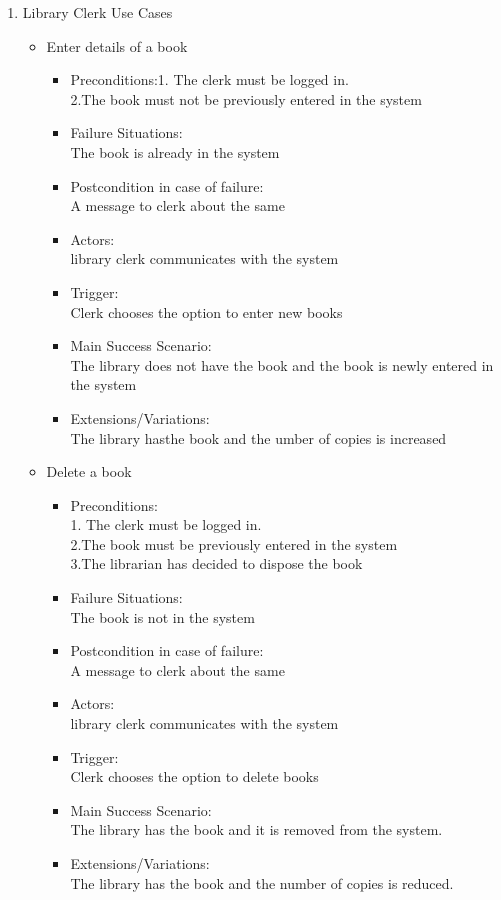 \documentclass{article}
\begin{document}
\begin{enumerate}
\item Library Clerk Use Cases
 \begin{itemize}
 \item Enter details of a book
 \begin{itemize}
 \item Preconditions:1. The clerk must be logged in.\\2.The book must not be previously entered in the system
 \item Failure Situations:\\ The book is already in the system
 \item Postcondition in case of failure:\\A message to clerk about the same
 \item Actors:\\ library clerk communicates with the system
 \item Trigger:\\ Clerk chooses the option to enter new books
 \item Main Success Scenario:\\ The library  does not have the book and the book is newly entered in the system
\item  Extensions/Variations:\\ The library hasthe book and the umber of copies is increased
\end{itemize}
 \item Delete a book 
 \begin{itemize}
	\item 	Preconditions:\\1. The clerk must be logged in.\\2.The book must  be previously entered in the system \\3.The librarian has decided to dispose the book\\
 \item Failure Situations:\\ The book is not in the system\\
 \item Postcondition in case of failure:\\A message to clerk about the same\\
 \item Actors:\\ library clerk communicates with the system\\
 \item Trigger:\\ Clerk chooses the option to delete books\\
 \item Main Success Scenario:\\ The library  has the book and it is removed from the system.\\
 \item Extensions/Variations: \\The library has the book and the number of copies is reduced.\\
 

\end{itemize}
\end{itemize}
\end{enumerate}
\end{document}
